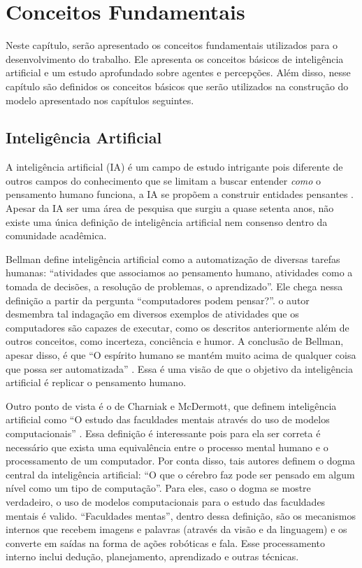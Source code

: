 \chapter{Conceitos Fundamentais}

%
Neste capítulo, serão apresentado os conceitos fundamentais utilizados para o desenvolvimento do trabalho. Ele apresenta os conceitos básicos de inteligência artificial e um estudo aprofundado sobre agentes e percepções. Além disso, nesse capítulo são definidos os conceitos básicos que serão utilizados na construção do modelo apresentado nos capítulos seguintes.

\section{Inteligência Artificial}

A inteligência artificial (IA) é um campo de estudo intrigante pois diferente de outros campos do conhecimento que se limitam a buscar entender \textit{como} o pensamento humano funciona, a IA se propõem a construir entidades pensantes \cite{russel2013artificial}. Apesar da IA ser uma área de pesquisa que surgiu a quase setenta anos, não existe uma única definição de inteligência artificial nem consenso dentro da comunidade acadêmica.

Bellman define inteligência artificial como a automatização de diversas tarefas humanas: ``atividades que associamos ao pensamento humano, atividades como a tomada de decisões, a resolução de problemas, o aprendizado''. Ele chega nessa definição a partir da pergunta ``computadores podem pensar?''. o autor desmembra tal indagação em diversos exemplos de atividades que os computadores são capazes de executar, como os descritos anteriormente além de outros conceitos, como incerteza, conciência e humor. A conclusão de Bellman, apesar disso, é que ``O espírito humano se mantém muito acima de qualquer coisa que possa ser automatizada'' \cite{bellman1978introduction}. Essa é uma visão de que o objetivo da inteligência artificial é replicar o pensamento humano.

Outro ponto de vista é o de Charniak e McDermott, que definem inteligência artificial como ``O estudo das faculdades mentais através do uso de modelos computacionais'' \cite{charniak1985introduction}. Essa definição é interessante pois para ela ser correta é necessário que exista uma equivalência entre o processo mental humano e o processamento de um computador. Por conta disso, tais autores definem o dogma central da inteligência artificial: ``O que o cérebro faz pode ser pensado em algum nível como um tipo de computação''. Para eles, caso o dogma se mostre verdadeiro, o uso de modelos computacionais para o estudo das faculdades mentais é valido. ``Faculdades mentas'', dentro dessa definição, são os mecanismos internos que recebem imagens e palavras (através da visão e da linguagem) e os converte em saídas na forma de ações robóticas e fala. Esse processamento interno inclui dedução, planejamento, aprendizado e outras técnicas.

